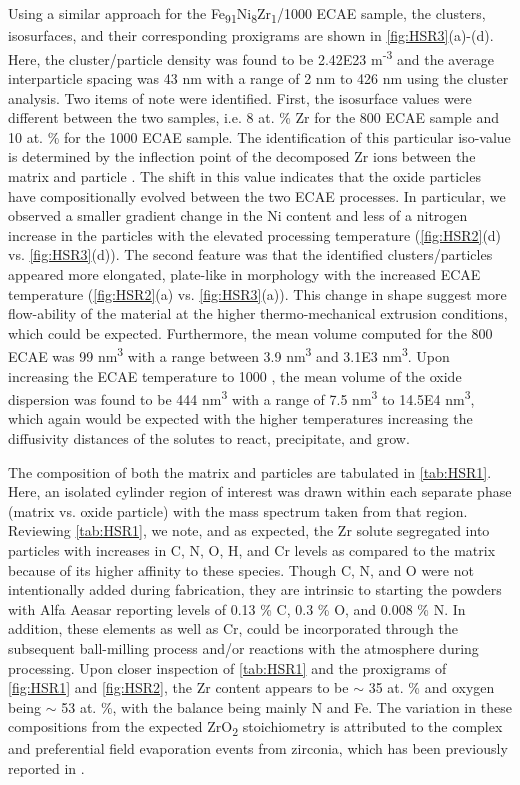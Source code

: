 		Using a similar approach for the Fe\textsubscript{91}Ni\textsubscript{8}Zr\textsubscript{1}/1000 \celsius{}   ECAE sample, the clusters, isosurfaces, and their corresponding proxigrams are shown in \ref{fig:HSR3}(a)-(d). Here, the cluster/particle density was found to be 2.42E23 m\textsuperscript{-3} and the average interparticle spacing was 43 nm with a range of 2 nm to 426 nm using the cluster analysis. Two items of note were identified. First, the isosurface values were different between the two samples, i.e. 8 at. \% Zr for the 800 \celsius{}   ECAE sample and 10 at. \% for the 1000 \celsius{}   ECAE sample. The identification of this particular iso-value is determined by the inflection point of the decomposed Zr ions between the matrix and particle \cite{RN214}. The shift in this value indicates that the oxide particles have compositionally evolved between the two ECAE processes. In particular, we observed a  smaller gradient change in the Ni content and less of a nitrogen increase in the particles with the elevated processing temperature (\ref{fig:HSR2}(d) vs. \ref{fig:HSR3}(d)). The second feature was that the identified clusters/particles appeared more elongated, plate-like in morphology with the increased ECAE temperature (\ref{fig:HSR2}(a) vs. \ref{fig:HSR3}(a)). This change in shape suggest more flow-ability of the material at the higher thermo-mechanical extrusion conditions, which could be expected. Furthermore, the mean volume computed for the 800 \celsius{}   ECAE was 99 nm\textsuperscript{3} with a range between 3.9 nm\textsuperscript{3} and 3.1E3 nm\textsuperscript{3}. Upon increasing the ECAE temperature to 1000 \celsius{}, the mean volume of the oxide dispersion was found to be 444 nm\textsuperscript{3} with a range of 7.5 nm\textsuperscript{3} to 14.5E4 nm\textsuperscript{3}, which again would be expected with the higher temperatures increasing the diffusivity distances of the solutes to react, precipitate, and grow.  
		
		The composition of both the matrix and particles are tabulated in \ref{tab:HSR1}. Here, an isolated cylinder region of interest was drawn within each separate phase (matrix vs. oxide particle) with the mass spectrum taken from that region. Reviewing \ref{tab:HSR1}, we note, and as expected, the Zr solute segregated into particles with increases in C, N, O, H, and Cr levels as compared to the matrix because of its higher affinity to these species. Though C, N, and O were not intentionally added during fabrication, they are intrinsic to starting the powders with Alfa Aeasar reporting levels of 0.13 \% C, 0.3 \% O, and 0.008 \% N. In addition, these elements as well as Cr, could be incorporated through the subsequent ball-milling process and/or reactions with the atmosphere during processing. Upon closer inspection of \ref{tab:HSR1} and the proxigrams of \ref{fig:HSR1} and \ref{fig:HSR2}, the Zr content appears to be $\sim$ 35 at. \% and oxygen being $\sim$ 53 at. \%, with the balance being mainly N and Fe. The variation in these compositions from the expected ZrO\textsubscript{2} stoichiometry is attributed to the complex and preferential field evaporation events from zirconia, which has been previously reported in \cite{RN368}.
		
